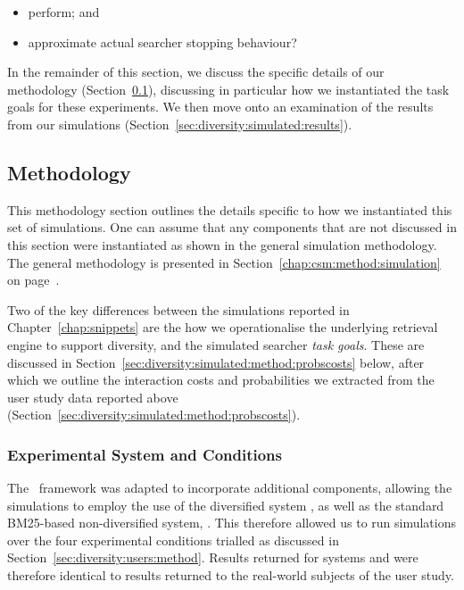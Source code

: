 \begin{itemize}
    \item{ perform; and}
    \item{ approximate actual searcher stopping behaviour?}
\end{itemize}

In the remainder of this section, we discuss the specific details of our methodology (Section~\ref{sec:diversity:simulated:method}), discussing in particular how we instantiated the task goals for these experiments. We then move onto an examination of the results from our simulations (Section~\ref{sec:diversity:simulated:results}).

\subsection{Methodology}\label{sec:diversity:simulated:method}
This methodology section outlines the details specific to how we instantiated this set of simulations. One can assume that any components that are not discussed in this section were instantiated as shown in the general simulation methodology. The general methodology is presented in Section~\ref{chap:csm:method:simulation} on page~\pageref{chap:csm:method:simulation}.

Two of the key differences between the simulations reported in Chapter~\ref{chap:snippets} are the how we operationalise the underlying retrieval engine to support diversity, and the simulated searcher \emph{task goals}. These are discussed in Section~\ref{sec:diversity:simulated:method:probscosts} below, after which we outline the interaction costs and probabilities we extracted from the user study data reported above (Section~\ref{sec:diversity:simulated:method:probscosts}).

\subsubsection{Experimental System and Conditions}\label{sec:diversity:simulated:method:system}
The \simiir~framework was adapted to incorporate additional components, allowing the simulations to employ the use of the diversified system , as well as the standard BM25-based non-diversified system, . This therefore allowed us to run simulations over the four experimental conditions trialled as discussed in Section~\ref{sec:diversity:users:method}. Results returned for systems  and  were therefore identical to results returned to the real-world subjects of the user study.


